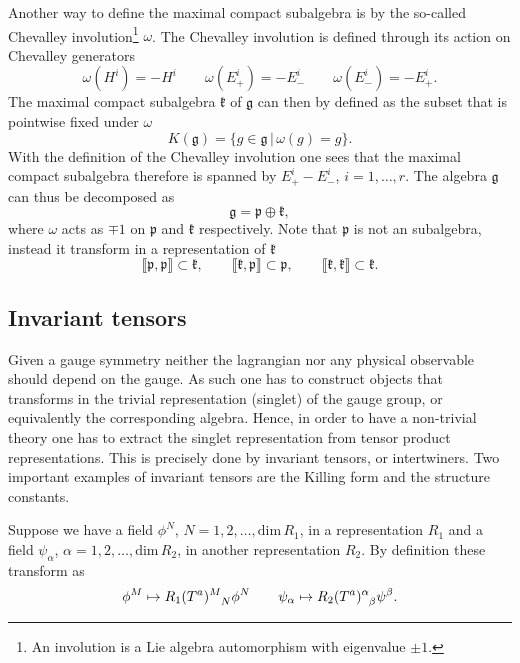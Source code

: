 Another way to define the maximal compact subalgebra is by the so-called Chevalley involution\footnote{An involution is a Lie algebra automorphism with eigenvalue $\pm 1$.} $\omega$. The Chevalley involution is defined through its action on Chevalley generators
\begin{equation}
    \omega(H^i) = -H^i\qquad \omega(E^i_+) = -E^i_- \qquad \omega(E^i_-) = -E^i_+.
\end{equation}
The maximal compact subalgebra $\mathfrak{k}$ of $\mathfrak{g}$ can then by defined as the subset that is pointwise fixed under $\omega$
\begin{equation}
    K(\mathfrak{g}) = \{g\in\mathfrak{g}\,|\, \omega (g) = g \}. 
\end{equation}
With the definition of the Chevalley involution one sees that the maximal compact subalgebra therefore is spanned by $E^i_+-E^i_-$, $i=1,\ldots,r$. The algebra $\mathfrak{g}$ can thus be decomposed as 
\begin{equation}
    \mathfrak{g} = \mathfrak{p}\oplus\mathfrak{k},
\end{equation}
where $\omega$ acts as $\mp 1$ on $\mathfrak{p}$ and $\mathfrak{k}$ respectively. Note that $\mathfrak{p}$ is not an subalgebra, instead it transform in a representation of $\mathfrak{k}$ 
\begin{equation}
    \llbracket \mathfrak{p},\mathfrak{p}\rrbracket \subset \mathfrak{k},\qquad \llbracket \mathfrak{k},\mathfrak{p}\rrbracket\subset \mathfrak{p},\qquad \llbracket \mathfrak{k},\mathfrak{k}\rrbracket \subset \mathfrak{k}.
\end{equation}

\subsection{Invariant tensors}
Given a gauge symmetry neither the lagrangian nor any physical observable should depend on the gauge. As such one has to construct objects that transforms in the trivial representation (singlet) of the gauge group, or equivalently the corresponding algebra. Hence, in order to have a non-trivial theory one has to extract the singlet representation from tensor product representations. This is precisely done by invariant tensors, or intertwiners. Two important examples of invariant tensors are the Killing form and the structure constants. 

Suppose we have a field $\phi^N$, $N=1,2,\ldots,\text{dim}\,R_1$, in a representation $R_1$ and a field $\psi_\alpha$, $\alpha=1,2,\ldots,\text{dim}\,R_2$, in another representation $R_2$. By definition these transform as 
\begin{equation}
    \phi^M \mapsto \tensor{R_1(T^a)}{^M_N}\phi^N \qquad \psi_\alpha\mapsto \tensor{R_2(T^a)}{^\alpha_\beta}\psi^\beta.
\end{equation}

